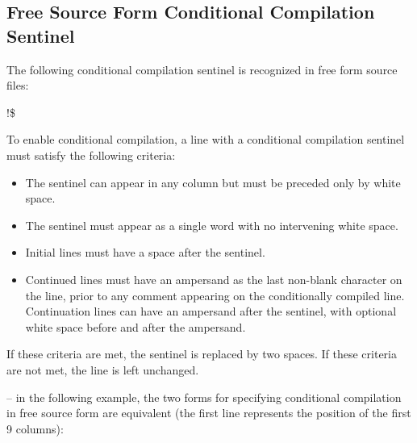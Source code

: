 \subsection{Free Source Form Conditional Compilation Sentinel}
\label{subsec:Free Source Form Conditional Compilation Sentinel}
The following conditional compilation sentinel is recognized in free form source files:

\begin{boxedcode}
!\$
\end{boxedcode}

To enable conditional compilation, a line with a conditional compilation sentinel must 
satisfy the following criteria: 

\begin{itemize}
\item The sentinel can appear in any column but must be preceded only by white space.

\item The sentinel must appear as a single word with no intervening white space. 

\item Initial lines must have a space after the sentinel. 

\item Continued lines must have an ampersand as the last non-blank character on the line, 
prior to any comment appearing on the conditionally compiled line. Continuation lines 
can have an ampersand after the sentinel, with optional white space before and after 
the ampersand. 
\end{itemize}

If these criteria are met, the sentinel is replaced by two spaces. If these criteria are not 
met, the line is left unchanged. 

\notestart
\noteheader – in the following example, the two forms for specifying conditional compilation 
in free source form are equivalent (the first line represents the position of the first 9 
columns):

\begin{alltt}
\end{alltt}
\noteend
\bigskip
\fortranspecificend









